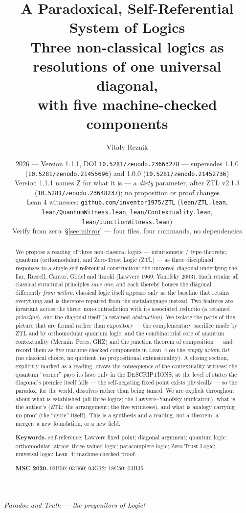 \documentclass[11pt]{article}
\title{\textbf{A Paradoxical, Self-Referential System of Logics}\\[4pt]
\large Three non-classical logics as resolutions of one universal diagonal,\\
with five machine-checked components}
\author{Vitaly Reznik}
\date{2026 --- Version 1.1.1, DOI \texttt{10.5281/zenodo.23663278} --- supersedes 1.1.0 (\texttt{10.5281/zenodo.21455696}) and 1.0.0 (\texttt{10.5281/zenodo.21452736})\\[2pt]
\small Version 1.1.1 names $\mathsf{Z}$ for what it is --- a \emph{dirty} parameter, after ZTL v2.1.3 (\texttt{10.5281/zenodo.23648237}); no proposition or proof changes\\[2pt]
\small Lean 4 witnesses: \texttt{github.com/inventor1975/ZTL}
(\texttt{lean/ZTL.lean}, \texttt{lean/QuantumWitness.lean}, \texttt{lean/Contextuality.lean}, \texttt{lean/JunctionWitness.lean})\\
\small Verify from zero: \S\ref{sec:mirror} --- four files, four commands, no dependencies}
\theoremstyle{remark}
\begin{document}
\maketitle

\begin{center}
\emph{Paradox and Truth --- the progenitors of Logic!}
\end{center}
\vspace{4pt}

\begin{abstract}
We propose a reading of three non-classical logics ---
intuitionistic / type-theoretic, quantum (orthomodular), and Zero-Trust
Logic (ZTL) --- as three disciplined responses to a single self-referential
construction: the universal diagonal underlying the liar, Russell, Cantor,
G\"odel and Tarski (Lawvere 1969; Yanofsky 2003). Each retains all classical
structural principles \emph{save one}, and each thereby houses the diagonal
differently \emph{from within}; classical logic itself appears only as the
baseline that retains everything and is therefore repaired from the
metalanguage instead. Two features are invariant across the three: non-contradiction
with its associated reductio (a retained \emph{principle}), and the diagonal
itself (a retained \emph{obstruction}). We isolate the parts of this
picture that are formal rather than expository --- the complementary sacrifice
made by ZTL and by orthomodular quantum logic, and the combinatorial core of
quantum contextuality (Mermin--Peres, GHZ) and the junction theorem of
composition --- and record them as five machine-checked components in Lean~4 on the \emph{empty axiom list} (no
classical choice, no quotient, no propositional extensionality). A closing
section, explicitly marked as a reading, draws the consequence of the
contextuality witness: the quantum ``corner'' pays its laws only in the
DESCRIPTIONS; at the level of states the diagonal's premise itself fails ---
the self-negating fixed point exists physically --- so the paradox, for the
world, dissolves rather than being tamed. We are
explicit throughout about what is established (all three logics; the
Lawvere--Yanofsky unification), what is the author's (ZTL; the arrangement;
the five witnesses), and what is analogy carrying no proof (the ``cycle''
itself). This is a synthesis and a reading, not a theorem, a merger, a new
foundation, or a new field.

\smallskip
\noindent\textbf{Keywords.} self-reference; Lawvere fixed point; diagonal
argument; quantum logic; orthomodular lattice; three-valued logic;
paracomplete logic; Zero-Trust Logic; universal logic; Lean~4;
machine-checked proof.

\smallskip
\noindent\textbf{MSC 2020.} 03B50; 03B60; 03G12; 18C50; 03B35.
\end{abstract}
\end{document}
